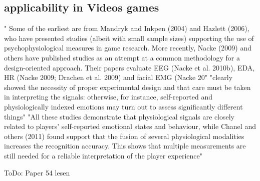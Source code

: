 \subsection{applicability in Videos games}
" Some of the earliest are from Mandryk and
Inkpen (2004) and Hazlett (2006), who have presented studies (albeit with
small sample sizes) supporting the use of psychophysiological measures in
game research. More recently, Nacke (2009) and others have published studies as an attempt at a common methodology for a design-oriented approach.
Their papers evaluate EEG (Nacke et al. 2010b), EDA, HR (Nacke 2009;
Drachen et al. 2009) and facial EMG (Nacke 20" \cite{kivikangas2011review}
"clearly showed the necessity of proper
experimental design and that care must be taken in interpreting the signals:
otherwise, for instance, self-reported and physiologically indexed emotions
may turn out to assess significantly different things"  \cite{kivikangas2011review}
"All these
studies demonstrate that physiological signals are closely related to players’
self-reported emotional states and behaviour, while Chanel and others (2011)
found support that the fusion of several physiological modalities increases the
recognition accuracy. This shows that multiple measurements are still needed
for a reliable interpretation of the player experience"  \cite{kivikangas2011review}





ToDo: Paper 54 lesen




